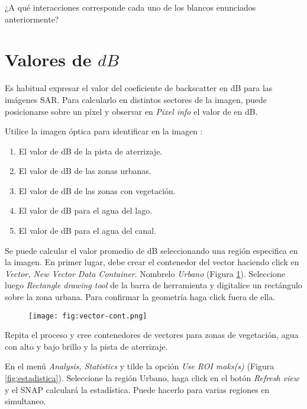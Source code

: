 \begin{que}
    ¿A qué interacciones corresponde cada uno de los blancos enunciados anteriormente?
\end{que}

\section{Valores de $dB$}

Es habitual expresar el valor del coeficiente de backscatter en dB para las imágenes SAR. Para calcularlo en distintos sectores de la imagen, puede posicionarse sobre un píxel y observar en \emph{Pixel info} el valor de  en dB.


Utilice la imagen óptica para identificar en la imagen :

 \begin{enumerate}
     \item El valor de dB de la pista de aterrizaje.
     \item El valor de dB de las zonas urbanas.
     \item El valor de dB de las zonas con vegetación.
     \item El valor de dB para el agua del lago.
     \item El valor de dB para el agua del canal.
 \end{enumerate}


Se puede calcular el valor promedio de dB seleccionando una región especifica en la imagen. En primer lugar, debe crear el contenedor del vector haciendo click en \emph{Vector, New Vector Data Container}. Nombrelo \emph{Urbano} (Figura \ref{fig:vector-cont}). Seleccione luego  \emph{Rectangle drawing tool} de la barra de herramienta y digitalice un rectángulo sobre la zona urbana. Para confirmar la geometría haga click fuera de ella.


\begin{figure}[h!]
    \centering
    \texttt{[image: fig:vector-cont.png]}
    \caption{}
    \label{fig:vector-cont}
\end{figure}

Repita el proceso y cree contenedores de vectores para zonas de vegetación, agua con alto y bajo brillo y la pista de aterrizaje.

En el menú \emph{Analysis, Statistics} y tilde la opción \emph{Use ROI maks(s)} (Figura \ref{fig:estadistica}). Seleccione la región Urbano, haga click en el botón \emph{Refresh view} y el SNAP calculará la estadística. Puede hacerlo para varias regiones en simultaneo.


